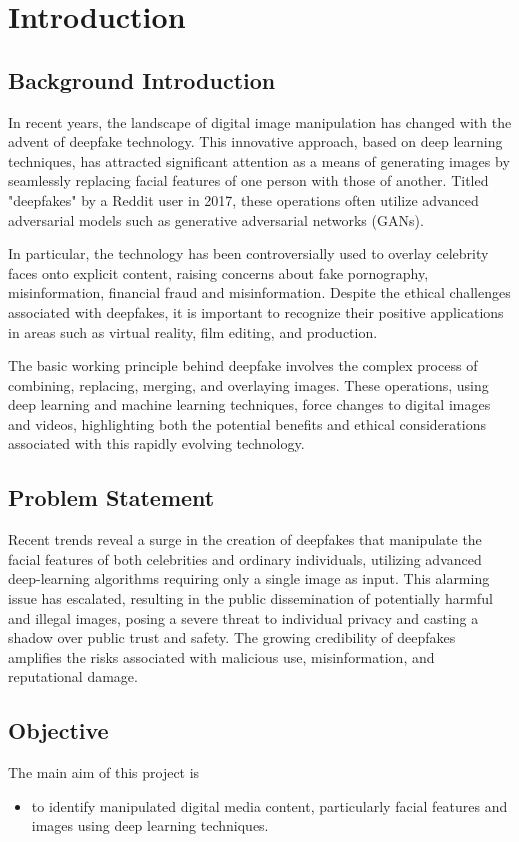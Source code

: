 \chapter{Introduction}
    \section{Background Introduction}
        In recent years, the landscape of digital image manipulation has changed with the advent of deepfake technology.
        This innovative approach, based on deep learning techniques, has attracted significant attention as a means of generating images by seamlessly replacing facial features of one person with those of another.
        Titled "deepfakes" by a Reddit user in 2017, these operations often utilize advanced adversarial models such as generative adversarial networks (GANs).

        In particular, the technology has been controversially used to overlay celebrity faces onto explicit content, raising concerns about fake pornography, misinformation, financial fraud and misinformation.
        Despite the ethical challenges associated with deepfakes, it is important to recognize their positive applications in areas such as virtual reality, film editing, and production.

        The basic working principle behind deepfake involves the complex process of combining, replacing, merging,  and overlaying images.
        These operations, using deep learning and machine learning techniques, force changes to digital images and videos, highlighting both the potential benefits and ethical considerations associated with this rapidly evolving technology.


    \section{Problem Statement}
        Recent trends reveal a surge in the creation of deepfakes that manipulate the facial features of both celebrities and ordinary individuals, utilizing advanced deep-learning algorithms requiring only a single image as input. This alarming issue has escalated, resulting in the public dissemination of potentially harmful and illegal images, posing a severe threat to individual privacy and casting a shadow over public trust and safety. The growing credibility of deepfakes amplifies the risks associated with malicious use, misinformation, and reputational damage.

    \section{Objective}
        The main aim of this project is 
        \begin{itemize}
            \item to identify manipulated digital media content, particularly facial features and images using deep learning techniques.
        \end{itemize}